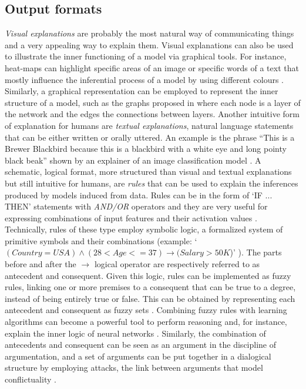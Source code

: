 \documentclass[final,1p,times]{elsarticle}
\begin{document}
\subsection{Output formats}
\emph{Visual explanations} are probably the most natural way of communicating things and a very appealing way to explain them.
Visual explanations can also be used to illustrate the inner functioning of a model via graphical tools. For instance, heat-maps can highlight specific areas of an image or specific words of a text that mostly influence the inferential process of a model by using different colours \cite{ribeiro2016should, strobelt2018lstmvis}. 
Similarly, a graphical representation can be employed to represent the inner structure of a model, such as the graphs proposed in \cite{wongsuphasawat2018visualizing} where each node is a layer of the network and the edges the connections between layers.
Another intuitive form of explanation for humans are \emph{textual explanations}, natural language statements that can be either written or orally uttered. An example is the phrase ``This is a Brewer Blackbird because this is a blackbird with a white eye and long pointy black beak'' shown by an explainer of an image classification model \cite{hendricks2018grounding}. 
A schematic, logical format, more structured than visual and textual explanations but still intuitive for humans, are \emph{rules} that can be used to explain the inferences produced by models induced from data. Rules can be in the form of `IF ... THEN' statements with \textit{AND/OR} operators and they are very useful for expressing combinations of input features and their activation values \cite{fung2005rule, bologna2017characterization}. 
Technically, rules of these type employ symbolic logic, a formalized system of primitive symbols and their combinations (example: `$(Country = USA) \wedge (28<Age<=37) \rightarrow  (Salary>50K$)' \cite{ribeiro2018anchors}). The parts before and after the $\rightarrow$ logical operator are respectively referred to as antecedent and consequent. Given this logic, rules can be implemented as fuzzy rules, linking one or more premises to a consequent that can be true to a degree, instead of being entirely true or false. This can be obtained by representing each antecedent and consequent as fuzzy sets \cite{guillaume2001designing}.
Combining fuzzy rules with learning algorithms can become a powerful tool to perform reasoning and, for instance, explain the inner logic of neural networks \cite{palade2001interpretation}.
Similarly, the combination of antecedents and consequent can be seen as an argument in the discipline of argumentation, and a set of arguments can be put together in a dialogical structure by employing attacks, the link between arguments that model conflictuality \cite{rizzo2019inferential, rizzo2018qualitative}.
\end{document}

